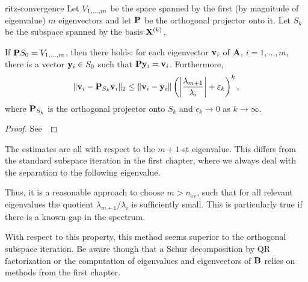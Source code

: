 \begin{Theorem}{ritz-convergence}
  Let $\esp{1,\dots,m}$ be the space spanned by the first (by
  magnitude of eigenvalue) $m$ eigenvectors and let $\matp$ be the
  orthogonal projector onto it. Let $S_k$ be the subspace spanned by
  the basis $\matx^{(k)}$.
  
  If $\matp S_0 = \esp{1,\dots,m}$, then there holds: for each
  eigenvector $\vv_i$ of $\mata$, $i=1,\dots,m$, there is a vector
  $\vy_i\in S_0$ such that $\matp\vy_i = \vv_i$. Furthermore,
  \begin{gather}
    \norm{\vv_i - \matp_{S_k} \vv_i}_2 \le \norm{\vv_i-\vy_i}
    \left(\abs*{\frac{\lambda_{m+1}}{\lambda_i}}+\epsilon_k\right)^k,
  \end{gather}
  where $\matp_{S_k}$ is the orthogonal projector onto $S_k$ and
  $\epsilon_k\to 0$ as $k \to \infty$.
\end{Theorem}

\begin{proof}
  See~\cite[Theorem 5.2]{Saad11}
\end{proof}

\begin{remark}
  The estimates are all with respect to the $m+1$-st eigenvalue. This
  differs from the standard subspace iteration in the first chapter,
  where we always deal with the separation to the following
  eigenvalue.
  
  Thus, it is a reasonable approach to choose $m > n_{\text{ev}}$,
  such that for all relevant eigenvalues the quotient
  $\lambda_{m+1}/\lambda_i$ is sufficiently small. This is
  particularly true if there is a known gap in the spectrum.

  With respect to this property, this method seems superior to the
  orthogonal subspace iteration. Be aware though that a Schur
  decomposition by QR factorization or the computation of eigenvalues
  and eigenvectors of $\matb$ relies on methods from the first
  chapter.
\end{remark}



